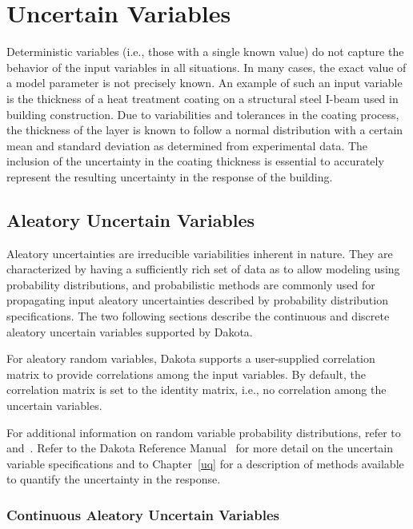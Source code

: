 \section{Uncertain Variables}\label{variables:uncertain}


Deterministic variables (i.e., those with a single known value) do not
capture the behavior of the input variables in all situations. In many
cases, the exact value of a model parameter is not precisely known. An
example of such an input variable is the thickness of a heat treatment
coating on a structural steel I-beam used in building construction.
Due to variabilities and tolerances in the coating process, the
thickness of the layer is known to follow a normal distribution with a
certain mean and standard deviation as determined from experimental
data. The inclusion of the uncertainty in the coating thickness is
essential to accurately represent the resulting uncertainty in the
response of the building.

\subsection{Aleatory Uncertain Variables}\label{variables:uncertain:auv}

Aleatory uncertainties are irreducible variabilities inherent in
nature.  They are characterized by having a sufficiently rich set of
data as to allow modeling using probability distributions, and
probabilistic methods are commonly used for propagating input aleatory
uncertainties described by probability distribution specifications.
The two following sections describe the continuous and discrete
aleatory uncertain variables supported by Dakota.

For aleatory random variables, Dakota supports a user-supplied
correlation matrix to provide correlations among the input
variables. By default, the correlation matrix is set to the identity
matrix, i.e., no correlation among the uncertain variables.

For additional information on random variable probability
distributions, refer to~\cite{Hal00} and~\cite{Swi04}. Refer to the Dakota
Reference Manual~\cite{RefMan} for more detail on the uncertain variable
specifications and to Chapter~\ref{uq} for a description of methods
available to quantify the uncertainty in the response.

\subsubsection{Continuous Aleatory Uncertain Variables}\label{variables:uncertain:cauv}

